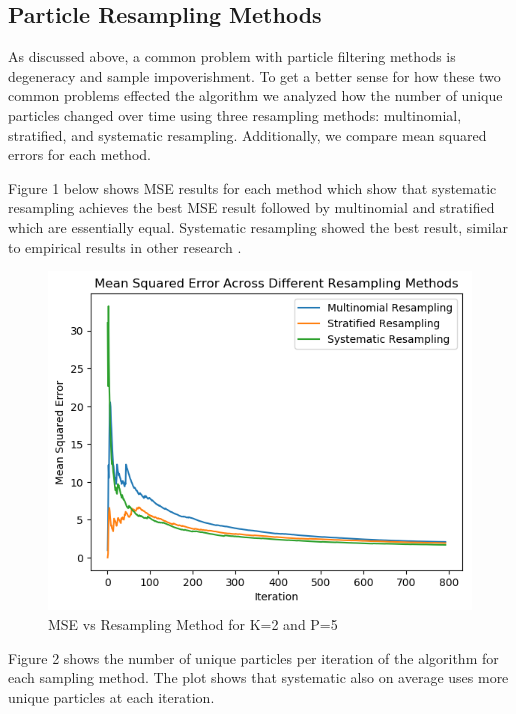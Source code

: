 \documentclass{article}
\begin{document}
\subsection{Particle Resampling Methods}

As discussed above, a common problem with particle filtering methods is degeneracy and sample impoverishment. To get a better sense for how these two common problems effected the algorithm we analyzed how the number of unique particles changed over time using three resampling methods: multinomial, stratified, and systematic resampling. Additionally, we compare mean squared errors for each method. 

Figure 1 below shows MSE results for each method which show that systematic resampling achieves the best MSE result followed by multinomial and stratified which are essentially equal. Systematic resampling showed the best result, similar to empirical results in other research \cite{doucet2009tutorial}.

\begin{figure}[ht]
\begin{center}
\centerline{\includegraphics[width=\columnwidth]{mse_resample}}
\caption{MSE vs Resampling Method for K=2 and P=5}
\label{MSEResampling}
\end{center}
\vskip -0.4in
\end{figure}

Figure 2 shows the number of unique particles per iteration of the algorithm for each sampling method. The plot shows that systematic also on average uses more unique particles at each iteration. 
\end{document}
